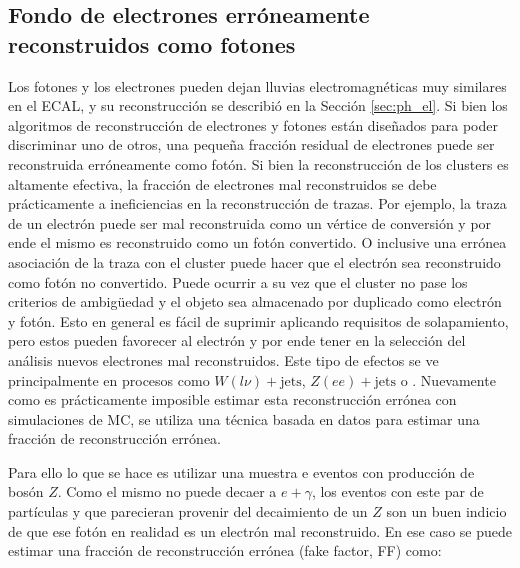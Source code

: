\subsection{Fondo de electrones erróneamente reconstruidos como fotones}\label{sec:efakes}

Los fotones y los electrones pueden dejan lluvias electromagnéticas muy
similares en el ECAL, y su reconstrucción se describió en la Sección \ref{sec:ph_el}.
Si bien los algoritmos de reconstrucción de electrones y fotones están diseñados para poder discriminar uno de otros, una pequeña fracción residual de electrones puede ser reconstruida erróneamente como fotón. Si bien la reconstrucción de los clusters es altamente efectiva, la fracción de electrones mal reconstruidos se debe prácticamente a ineficiencias en la reconstrucción de trazas. Por ejemplo, la traza de un electrón puede ser mal reconstruida como un vértice de conversión y por ende el mismo es reconstruido como un fotón convertido. O inclusive una errónea asociación de la traza con el cluster puede hacer que el electrón sea reconstruido como fotón no convertido.
Puede ocurrir a su vez que el cluster no pase los criterios de ambigüedad y el objeto sea almacenado por duplicado como electrón y fotón. Esto en general es fácil de suprimir aplicando requisitos de solapamiento, pero estos pueden favorecer al electrón y por ende tener en la selección del análisis nuevos electrones mal reconstruidos. Este tipo de efectos se ve principalmente en procesos como $W(l\nu)+\text{jets}$, $Z(ee)+\text{jets}$ o \ttbar. Nuevamente como es prácticamente imposible estimar esta reconstrucción errónea con simulaciones de MC, se utiliza una técnica basada en datos para estimar una fracción de reconstrucción errónea.

Para ello lo que se hace es utilizar una muestra e eventos con producción de bosón $Z$. Como el mismo no puede decaer a $e+\gamma$, los eventos con este par de partículas y que parecieran provenir del decaimiento de un $Z$ son un buen indicio de que ese fotón en realidad es un electrón mal reconstruido. En ese caso se puede estimar una fracción de reconstrucción errónea (fake factor, FF) como:

